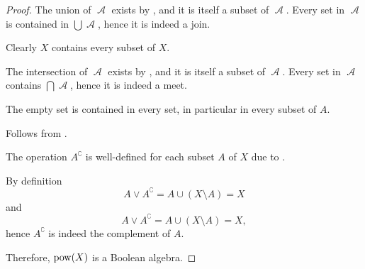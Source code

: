 \begin{proof}
   The union of \( \mscrA \) exists by , and it is itself a subset of \( \mscrA \). Every set in \( \mscrA \) is contained in \( \bigcup \mscrA \), hence it is indeed a join.

   Clearly \( X \) contains every subset of \( X \).

   The intersection of \( \mscrA \) exists by , and it is itself a subset of \( \mscrA \). Every set in \( \mscrA \) contains \( \bigcap \mscrA \), hence it is indeed a meet.

   The empty set is contained in every set, in particular in every subset of \( A \).

   Follows from .

   The operation \( A^\complement \) is well-defined for each subset \( A \) of \( X \) due to .

  By definition
  \begin{equation*}
    A \vee A^\complement
    =
    A \cup (X \setminus A)
    =
    X
  \end{equation*}
  and
  \begin{equation*}
    A \vee A^\complement
    =
    A \cup (X \setminus A)
    =
    X,
  \end{equation*}
  hence \( A^\complement \) is indeed the complement of \( A \).

  Therefore, \( \operatorname{pow}(X) \) is a Boolean algebra.
\end{proof}

